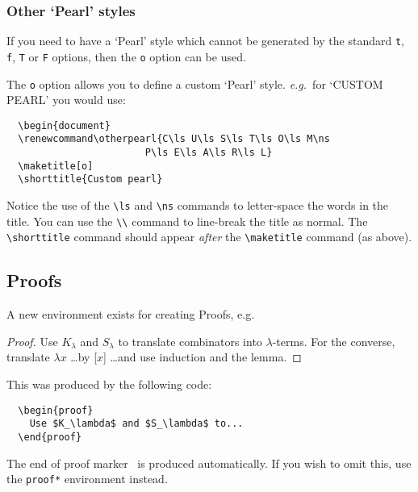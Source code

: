 \documentclass{jfp1}
\newcommand\eg{\emph{e.g.}\ }
\begin{document}
\subsubsection{Other `Pearl' styles}

If you need to have a `Pearl' style which cannot be generated by the
standard \verb"t", \verb"f", \verb"T" or \verb"F" options, then the \verb"o"
option can be used.

The \verb"o" option allows you to define a custom `Pearl' style. \eg for
`CUSTOM PEARL' you would use:
%
\begin{verbatim}
  \begin{document}
  \renewcommand\otherpearl{C\ls U\ls S\ls T\ls O\ls M\ns
                        P\ls E\ls A\ls R\ls L}
  \maketitle[o]
  \shorttitle{Custom pearl}
\end{verbatim}
%
Notice the use of the \verb"\ls" and \verb"\ns" commands to letter-space the
words in the title.
You can use the \verb"\\" command to line-break the title as normal.
The \verb"\shorttitle" command should appear \emph{after} the
\verb"\maketitle" command (as above).

\subsection{Proofs}

A new environment exists for creating Proofs, e.g.
%
\begin{proof}
  Use $K_\lambda$ and $S_\lambda$ to translate combinators
  into $\lambda$-terms. For the converse, translate
  $\lambda x$ \ldots by [$x$] \ldots and use induction
  and the lemma.
\end{proof}
%
This was produced by the following code:
%
\begin{verbatim}
  \begin{proof}
    Use $K_\lambda$ and $S_\lambda$ to...
  \end{proof}
\end{verbatim}
%
The end of proof marker \proofbox\ is produced automatically. If you wish
to omit this, use the \verb"proof*" environment instead.
\end{document}
